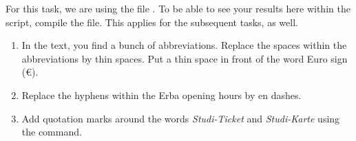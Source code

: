 For this task, we are using the file .
To be able to see your results here within the script,
compile the  file.
This applies for the subsequent tasks, as well.

\begin{enumerate}
	\item In the text, you find a bunch of abbreviations. Replace the spaces 
	within the abbreviations by thin spaces. Put a thin space in front of the 
	word Euro sign (€).
	\item Replace the hyphens within the Erba opening hours by en dashes.
	\item Add quotation marks around the words \emph{Studi-Ticket} and 
	\emph{Studi-Karte} using the  command. 
\end{enumerate}


